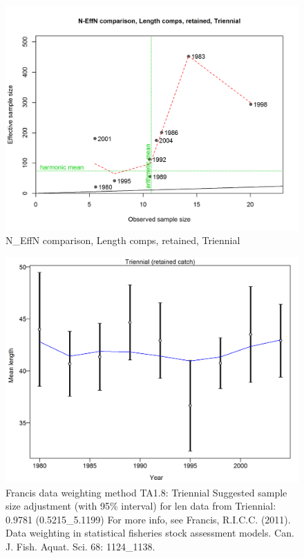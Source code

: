 \documentclass[12pt,]{article}
\begin{document}
\begin{figure}[htbp]
\centering
\includegraphics{./r4ss/plots_mod1/comp_lenfit_sampsize_flt5mkt2.png}
\caption{N\_EffN comparison, Length comps, retained, Triennial
\label{fig:mod1_24_comp_lenfit_sampsize_flt5mkt2}}
\end{figure}

\begin{figure}[htbp]
\centering
\includegraphics{./r4ss/plots_mod1/comp_lenfit_data_weighting_TA1.8_Triennial.png}
\caption{Francis data weighting method TA1.8: Triennial Suggested sample
size adjustment (with 95\% interval) for len data from Triennial: 0.9781
(0.5215\_5.1199) For more info, see Francis, R.I.C.C. (2011). Data
weighting in statistical fisheries stock assessment models. Can. J.
Fish. Aquat. Sci. 68: 1124\_1138.
\label{fig:mod1_25_comp_lenfit_data_weighting_TA1.8_Triennial}}
\end{figure}
\end{document}
